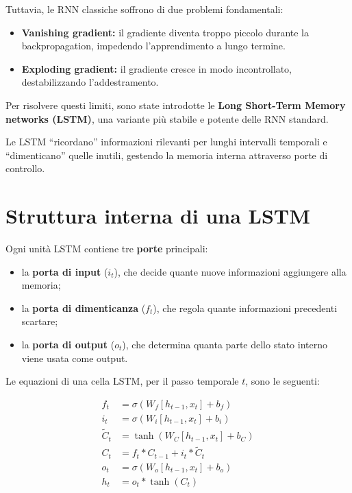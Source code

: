 \documentclass[11pt,a4paper]{report}
\begin{document}
Tuttavia, le RNN classiche soffrono di due problemi fondamentali:
\begin{itemize}
  \item \textbf{Vanishing gradient:} il gradiente diventa troppo piccolo durante la backpropagation, impedendo l’apprendimento a lungo termine.
  \item \textbf{Exploding gradient:} il gradiente cresce in modo incontrollato, destabilizzando l’addestramento.
\end{itemize}

Per risolvere questi limiti, sono state introdotte le \textbf{Long Short-Term Memory networks (LSTM)}, una variante più stabile e potente delle RNN standard.

\begin{tcolorbox}[title=Idea chiave]
Le LSTM “ricordano” informazioni rilevanti per lunghi intervalli temporali e “dimenticano” quelle inutili, gestendo la memoria interna attraverso porte di controllo.
\end{tcolorbox}

\section{Struttura interna di una LSTM}

Ogni unità LSTM contiene tre \textbf{porte} principali:
\begin{itemize}
  \item la \textbf{porta di input} ($i_t$), che decide quante nuove informazioni aggiungere alla memoria;
  \item la \textbf{porta di dimenticanza} ($f_t$), che regola quante informazioni precedenti scartare;
  \item la \textbf{porta di output} ($o_t$), che determina quanta parte dello stato interno viene usata come output.
\end{itemize}

Le equazioni di una cella LSTM, per il passo temporale $t$, sono le seguenti:

\[
\begin{aligned}
f_t &= \sigma(W_f [h_{t-1}, x_t] + b_f) \\
i_t &= \sigma(W_i [h_{t-1}, x_t] + b_i) \\
\tilde{C}_t &= \tanh(W_C [h_{t-1}, x_t] + b_C) \\
C_t &= f_t * C_{t-1} + i_t * \tilde{C}_t \\
o_t &= \sigma(W_o [h_{t-1}, x_t] + b_o) \\
h_t &= o_t * \tanh(C_t)
\end{aligned}
\]
\end{document}
